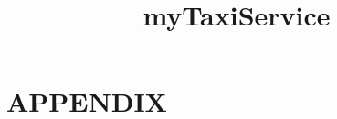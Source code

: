 \documentclass[notoc,a4paper]{tufte-book}
\title{myTaxiService}
\begin{document}



\setcounter{tocdepth}{2}
\tableofcontents







\chapter{APPENDIX}


\end{document}
